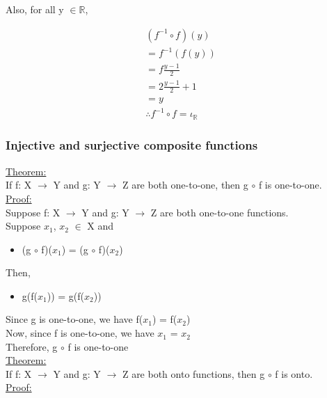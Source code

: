 \documentclass{article}
\begin{document}
Also, for all y $\in \mathbb{R}$, 

\begin{align}
(f^{-1} \circ f)(y) \\
= f^{-1}(f(y)) \\
= f\frac{y - 1}{2}\\
= 2\frac{y-1}{2} + 1 \\
= y \\
\therefore f^{-1} \circ f = \iota_{\mathbb{R}}
\end{align}

\subsubsection{Injective and surjective composite functions}

\underline{Theorem:} \\

If f: X $\longrightarrow$ Y and g: Y $\longrightarrow$ Z are both one-to-one, then g $\circ$ f is one-to-one. \\

\underline{Proof:} \\

Suppose f: X $\longrightarrow$ Y and g: Y $\longrightarrow$ Z are both one-to-one functions. \\
Suppose $x_{1}$, $x_{2}$ $\in$ X and
\begin{itemize}
\item (g $\circ$ f)($x_{1}$) = (g $\circ$ f)($x_{2}$)
\end{itemize}

Then, 
\begin{itemize}
\item g(f($x_{1}$)) = g(f($x_{2}$))
\end{itemize}

Since g is one-to-one, we have f($x_{1}$) = f($x_{2}$) \\

Now, since f is one-to-one, we have $x_{1}$ = $x_{2}$ \\

Therefore, g $\circ$ f is one-to-one \\

\underline{Theorem:} \\

If f: X $\longrightarrow$ Y and g: Y $\longrightarrow$ Z are both onto functions, then g $\circ$ f is onto. \\

\underline{Proof:} \\
\end{document}
